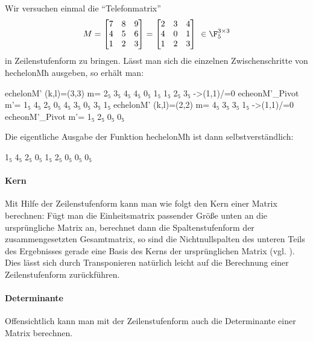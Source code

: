 

\begin{beispiel}
  Wir versuchen einmal die "`Telefonmatrix"' 
  \[ M = \begin{bmatrix} 7&8&9\\ 4&5&6\\ 1&2&3\end{bmatrix} = 
      \begin{bmatrix}2&3&4 \\ 4&0&1\\ 1&2&3\end{bmatrix} \ 
      \in \F_5^{3\times 3}\]
  in Zeilenstufenform zu bringen. Lässt man sich die einzelnen 
  Zwischenschritte von ħechelonMħ ausgeben, so erhält man:
  \begin{hcode}
echelonM' (k,l)=(3,3) m=
2₅ 3₅ 4₅ 
4₅ 0₅ 1₅ 
1₅ 2₅ 3₅ 
	->(1,1)/=0
echeonM'_Pivot m'=
1₅ 4₅ 2₅ 
0₅ 4₅ 3₅ 
0₅ 3₅ 1₅
echelonM' (k,l)=(2,2) m=
4₅ 3₅ 
3₅ 1₅ 
	->(1,1)/=0
echeonM'_Pivot m'=
1₅ 2₅ 
0₅ 0₅ 
  \end{hcode}
  Die eigentliche Ausgabe der Funktion ħechelonMħ ist dann selbstverständlich:
\begin{hcode}
1₅ 4₅ 2₅ 
0₅ 1₅ 2₅ 
0₅ 0₅ 0₅ 
\end{hcode}
\end{beispiel}


\paragraph{Kern} Mit Hilfe der Zeilenstufenform kann man wie folgt den Kern 
einer Matrix berechnen: Fügt man die Einheitsmatrix passender Größe unten an
die ursprüngliche Matrix an, berechnet dann die Spaltenstufenform der
zusammengesetzten Gesamtmatrix, so sind die Nichtnullspalten des unteren Teils
des Ergebnisses gerade eine Basis des Kerns der ursprünglichen Matrix (vgl.
\cite[Abschnitt Basis]{wiki:matrix-kernel}). Dies lässt sich durch
Transponieren natürlich leicht auf die Berechnung einer Zeilenstufenform
zurückführen.


\paragraph{Determinante} Offensichtlich kann man mit der Zeilenstufenform auch
die Determinante einer Matrix berechnen.


